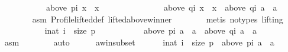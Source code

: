 \begin{isabellebody}
\ \ \ \ \ \ \ \ \ \ \ {\isacharparenleft}{\kern0pt}above\ {\isacharparenleft}{\kern0pt}p{\isacharbang}{\kern0pt}i{\isacharparenright}{\kern0pt}\ x\ {\isacharequal}{\kern0pt}\ {\isacharbraceleft}{\kern0pt}x{\isacharbraceright}{\kern0pt}\ {\isasymlongrightarrow}\isanewline
\ \ \ \ \ \ \ \ \ \ \ \ \ \ {\isacharparenleft}{\kern0pt}above\ {\isacharparenleft}{\kern0pt}q{\isacharbang}{\kern0pt}i{\isacharparenright}{\kern0pt}\ x\ {\isacharequal}{\kern0pt}\ {\isacharbraceleft}{\kern0pt}x{\isacharbraceright}{\kern0pt}\ {\isasymor}\ above\ {\isacharparenleft}{\kern0pt}q{\isacharbang}{\kern0pt}i{\isacharparenright}{\kern0pt}\ a\ {\isacharequal}{\kern0pt}\ {\isacharbraceleft}{\kern0pt}a{\isacharbraceright}{\kern0pt}{\isacharparenright}{\kern0pt}{\isacharparenright}{\kern0pt}{\isachardoublequoteclose}\isanewline
\ \ \ \ \ \ \isamarkupfalse%
\ asm{}\ Profile{\isachardot}{\kern0pt}lifted{\isacharunderscore}{\kern0pt}def\ lifted{\isacharunderscore}{\kern0pt}above{\isacharunderscore}{\kern0pt}winner\isanewline
\ \ \ \ \ \ \isamarkupfalse%
\ {\isacharparenleft}{\kern0pt}metis\ {\isacharparenleft}{\kern0pt}no{\isacharunderscore}{\kern0pt}types{\isacharcomma}{\kern0pt}\ lifting{\isacharparenright}{\kern0pt}{\isacharparenright}{\kern0pt}\isanewline
\ \ \ \ \isamarkupfalse%
\isanewline
\ \ \ \ \ \ {\isachardoublequoteopen}{\isasymforall}i{\isacharcolon}{\kern0pt}{\isacharcolon}{\kern0pt}nat{\isachardot}{\kern0pt}\ i\ {\isacharless}{\kern0pt}\ size\ p\ {\isasymlongrightarrow}\isanewline
\ \ \ \ \ \ \ \ \ \ {\isacharparenleft}{\kern0pt}above\ {\isacharparenleft}{\kern0pt}p{\isacharbang}{\kern0pt}i{\isacharparenright}{\kern0pt}\ a\ {\isacharequal}{\kern0pt}\ {\isacharbraceleft}{\kern0pt}a{\isacharbraceright}{\kern0pt}\ {\isasymlongrightarrow}\ above\ {\isacharparenleft}{\kern0pt}q{\isacharbang}{\kern0pt}i{\isacharparenright}{\kern0pt}\ a\ {\isacharequal}{\kern0pt}\ {\isacharbraceleft}{\kern0pt}a{\isacharbraceright}{\kern0pt}{\isacharparenright}{\kern0pt}{\isachardoublequoteclose}\isanewline
\ \ \ \ \ \ \isamarkupfalse%
\ asm{}\isanewline
\ \ \ \ \ \ \isamarkupfalse%
\ auto\isanewline
\ \ \ \ \isamarkupfalse%
\ a{\isacharunderscore}{\kern0pt}win{\isacharunderscore}{\kern0pt}subset{\isacharcolon}{\kern0pt}\isanewline
\ \ \ \ \ \ {\isachardoublequoteopen}{\isacharbraceleft}{\kern0pt}i{\isacharcolon}{\kern0pt}{\isacharcolon}{\kern0pt}nat{\isachardot}{\kern0pt}\ i\ {\isacharless}{\kern0pt}\ size\ p\ {\isasymand}\ above\ {\isacharparenleft}{\kern0pt}p{\isacharbang}{\kern0pt}i{\isacharparenright}{\kern0pt}\ a\ {\isacharequal}{\kern0pt}\ {\isacharbraceleft}{\kern0pt}a{\isacharbraceright}{\kern0pt}{\isacharbraceright}{\kern0pt}\ {\isasymsubseteq}\isanewline

\end{isabellebody}
